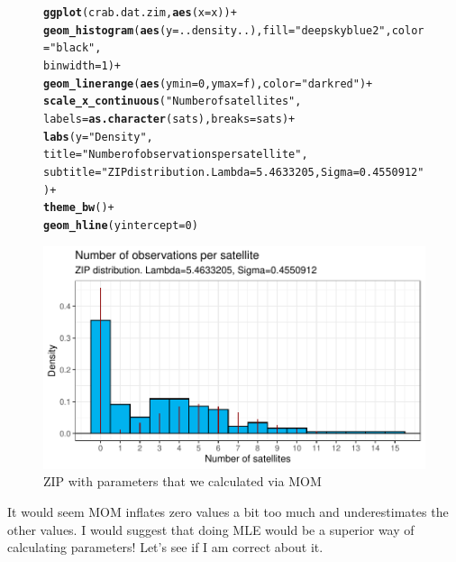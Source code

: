 \documentclass{article}\usepackage[]{graphicx}\usepackage[]{color}
\makeatletter
\def\maxwidth{ %
  \ifdim\Gin@nat@width>\linewidth
    \linewidth
  \else
    \Gin@nat@width
  \fi
}
\newcommand{\hlnum}[1]{\textcolor[rgb]{0.686,0.059,0.569}{#1}}%
\newcommand{\hlstr}[1]{\textcolor[rgb]{0.192,0.494,0.8}{#1}}%
\newcommand{\hlopt}[1]{\textcolor[rgb]{0,0,0}{#1}}%
\newcommand{\hlstd}[1]{\textcolor[rgb]{0.345,0.345,0.345}{#1}}%
\newcommand{\hlkwc}[1]{\textcolor[rgb]{0.333,0.667,0.333}{#1}}%
\newcommand{\hlkwd}[1]{\textcolor[rgb]{0.737,0.353,0.396}{\textbf{#1}}}%
\newenvironment{kframe}{%
 \def\at@end@of@kframe{}%
 \ifinner\ifhmode%
  \def\at@end@of@kframe{\end{minipage}}%
  \begin{minipage}{\columnwidth}%
 \fi\fi%
 \def\FrameCommand##1{\hskip\@totalleftmargin \hskip-\fboxsep
 \colorbox{shadecolor}{##1}\hskip-\fboxsep
     \hskip-\linewidth \hskip-\@totalleftmargin \hskip\columnwidth}%
 \MakeFramed {\advance\hsize-\width
   \@totalleftmargin\z@ \linewidth\hsize
   \@setminipage}}%
 {\par\unskip\endMakeFramed%
 \at@end@of@kframe}
\newenvironment{knitrout}{}{} %
\makeatother
\begin{document}
\begin{enumerate}
\begin{enumerate}
\begin{figure}[H]
\begin{center}
\begin{knitrout}
\begin{kframe}
\begin{alltt}
\hlkwd{ggplot}\hlstd{(crab.dat.zim,} \hlkwd{aes}\hlstd{(}\hlkwc{x}\hlstd{=x))}\hlopt{+}
          \hlkwd{geom_histogram}\hlstd{(}\hlkwd{aes}\hlstd{(}\hlkwc{y}\hlstd{=..density..),} \hlkwc{fill}\hlstd{=}\hlstr{"deepskyblue2"}\hlstd{,} \hlkwc{color}\hlstd{=}\hlstr{"black"}\hlstd{,}
                         \hlkwc{binwidth}\hlstd{=}\hlnum{1}\hlstd{)}\hlopt{+}
          \hlkwd{geom_linerange}\hlstd{(}\hlkwd{aes}\hlstd{(}\hlkwc{ymin}\hlstd{=}\hlnum{0}\hlstd{,} \hlkwc{ymax}\hlstd{=f),} \hlkwc{color}\hlstd{=}\hlstr{"dark red"}\hlstd{)}\hlopt{+}
          \hlkwd{scale_x_continuous}\hlstd{(}\hlstr{"Number of satellites"}\hlstd{,}
                             \hlkwc{labels} \hlstd{=} \hlkwd{as.character}\hlstd{(sats),} \hlkwc{breaks} \hlstd{= sats)}\hlopt{+}
          \hlkwd{labs}\hlstd{(}\hlkwc{y}\hlstd{=}\hlstr{"Density"}\hlstd{,}
               \hlkwc{title}\hlstd{=}\hlstr{"Number of observations per satellite"}\hlstd{,}
               \hlkwc{subtitle}\hlstd{=}\hlstr{"ZIP distribution. Lambda=5.4633205, Sigma=0.4550912"}\hlstd{)}\hlopt{+}
  \hlkwd{theme_bw}\hlstd{()}\hlopt{+}
  \hlkwd{geom_hline}\hlstd{(}\hlkwc{yintercept}\hlstd{=}\hlnum{0}\hlstd{)}
\end{alltt}
\end{kframe}
\includegraphics[width=\maxwidth]{figure/plot2-1} 
\end{knitrout}
\caption{ZIP with parameters that we calculated via MOM}
\label{plot2}
\end{center}
\end{figure}
It would seem MOM inflates zero values a bit too much and underestimates the other values. I would suggest that doing MLE would be a superior way of calculating parameters! Let's see if I am correct about it.


\end{enumerate}
\end{enumerate}
\end{document}
